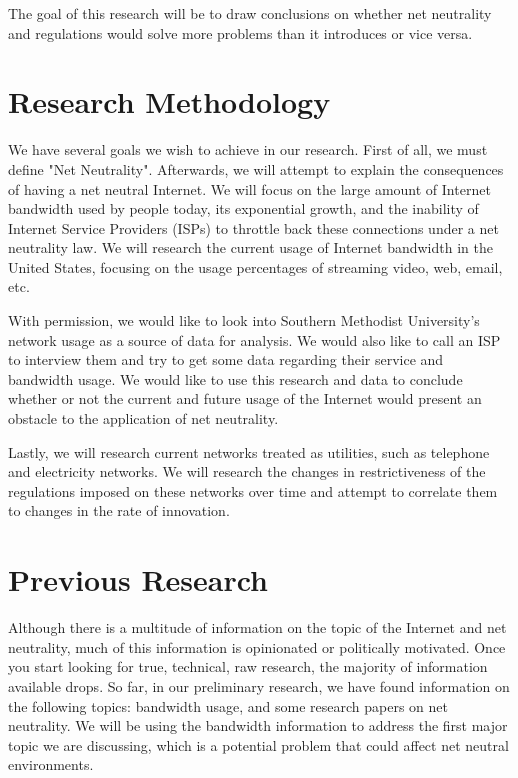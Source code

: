 \documentclass{sigcomm-alternate}
\begin{document}
The goal of this research will be to draw conclusions on whether net neutrality and regulations would solve more problems than it introduces or vice versa.



     		
\section{Research Methodology}
We have several goals we wish to achieve in our research. First of all, we must define "Net Neutrality". Afterwards, we will attempt to explain the consequences of having a net neutral Internet. We will focus on the large amount of Internet bandwidth used by people today, its exponential growth, and the inability of Internet Service Providers (ISPs) to throttle back these connections under a net neutrality law. We will research the current usage of Internet bandwidth in the United States, focusing on the usage percentages of streaming video, web, email, etc. 

With permission, we would like to look into Southern Methodist University's network usage as a source of data for analysis. We would also like to call an ISP to interview them and try to get some data regarding their service and bandwidth usage. We would like to use this research and data to conclude whether or not the current and future usage of the Internet would present an obstacle to the application of net neutrality.  

Lastly, we will research current networks treated as utilities, such as telephone and electricity networks. We will research the changes in restrictiveness of the regulations imposed on these networks over time and attempt to correlate them to changes in the rate of innovation.


\section{Previous Research}
Although there is a multitude of information on the topic of the Internet and net neutrality, much of this information is opinionated or politically motivated. Once you start looking for true, technical, raw research, the majority of information available drops. So far, in our preliminary research, we have found information on the following topics: bandwidth usage, and some research papers on net neutrality. We will be using the bandwidth information to address the first major topic we are discussing, which is a potential problem that could affect net neutral environments. 
\end{document}
